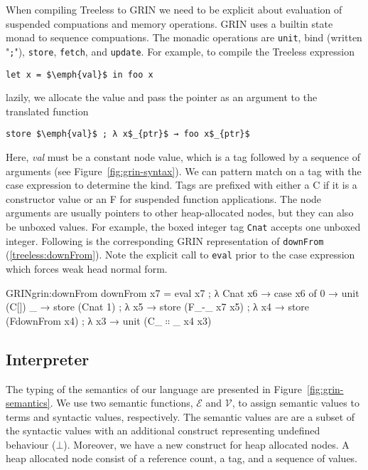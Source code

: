 \documentclass[9pt, twocolumn]{article}
\newcommand{\refp}[1]{(\ref{#1})}
\begin{document}
When compiling Treeless to GRIN we need to be explicit about evaluation of suspended compuations and memory operations.
GRIN uses a builtin state monad to sequence compuations. 
The monadic operations are \lstinline{unit}, bind (written "\lstinline{;}"), \lstinline{store}, \lstinline{fetch}, and \lstinline{update}. 
For example, to compile the Treeless expression
\begin{lstlisting}[language=Treeless, xleftmargin=1em]
let x = $\emph{val}$ in foo x
\end{lstlisting}
lazily, we allocate the value and pass the pointer as an argument to the translated function
\begin{lstlisting}[language=GRIN, xleftmargin=1em]
store $\emph{val}$ ; λ x$_{ptr}$ → foo x$_{ptr}$
\end{lstlisting}
Here, \emph{val} must be a constant node value, which is a tag followed by a sequence of arguments (see \mbox{Figure \ref{fig:grin-syntax}}). 
We can pattern match on a tag with the case expression to determine the kind.
Tags are prefixed with either a C if it is a constructor value or an F for suspended function applications.
The node arguments are usually pointers to other heap-allocated nodes, but they can also be unboxed values.
For example, the boxed integer tag \lstinline{Cnat} accepts one unboxed integer.
Following is the corresponding GRIN representation of \lstinline{downFrom} \refp{treeless:downFrom}.
Note the explicit call to \lstinline{eval} prior to the case expression which forces weak head normal form.

\begin{typewriter}{GRIN}{grin:downFrom}
downFrom x7 =
  eval x7 ; λ Cnat x6 →
  case x6 of
    0 → unit (C[])
    _ →
      store (Cnat 1) ; λ x5 →
      store (F_-_ x7 x5) ; λ x4 →
      store (FdownFrom x4) ; λ x3 →
      unit (C_$∷$_ x4 x3)
\end{typewriter}%

\label{sec:grin-interpreter}
\subsection{Interpreter}
The typing of the semantics of our language are presented in \mbox{Figure \ref{fig:grin-semantics}}.
We use two semantic functions, $\mathcal{E}$ and $\mathcal{V}$, to assign semantic values to terms and syntactic values, respectively.
The semantic values are are a subset of the syntactic values with an additional construct representing undefined behaviour ($\bot$).
Moreover, we have a new construct for heap allocated nodes. 
A heap allocated node consist of a reference count, a tag, and a sequence of values.
\end{document}
